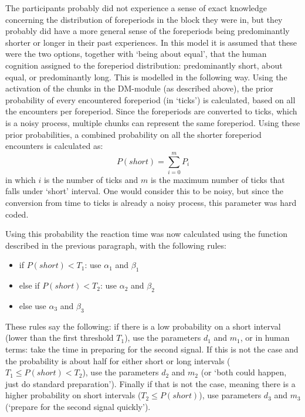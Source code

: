 \documentclass[10pt,letterpaper]{article}
\begin{document}
The participants probably did not experience a sense of exact knowledge concerning the distribution of foreperiods in the block they were in, but they probably did have a more general sense of the foreperiods being predominantly shorter or longer in their past experiences. In this model it is assumed that these were the two options, together with `being about equal', that the human cognition assigned to the foreperiod distribution: predominantly short, about equal, or predominantly long.
This is modelled in the following way. Using the activation of the chunks in the DM-module (as described above), the prior probability of every encountered foreperiod (in `ticks') is calculated, based on all the encounters per foreperiod. Since the foreperiods are converted to ticks, which is a noisy process, multiple chunks can represent the same foreperiod. Using these prior probabilities, a combined probability on all the shorter foreperiod encounters is calculated as:
\begin{equation}
	P(short) = \sum_{i = 0}^{m} P_i
\end{equation}
in which $i$ is the number of ticks and $m$ is the maximum number of ticks that falls under `short' interval. One would consider this to be noisy, but since the conversion from time to ticks is already a noisy process, this parameter was hard coded.

Using this probability the reaction time was now calculated using the function described in the previous paragraph, with the following rules:
\begin{itemize}
	\item if $P(short) < T_1$: use $\alpha_1$ and $\beta_1$
	\item else if $P(short) < T_2$: use $\alpha_2$ and $\beta_2$
	\item else use $\alpha_3$ and $\beta_3$
\end{itemize}
These rules say the following: if there is a low probability on a short interval (lower than the first threshold $T_1$), use the parameters $d_1$ and $m_1$, or in human terms: take the time in preparing for the second signal. If this is not the case and the probability is about half for either short or long intervals ($T_1 \leq P(short) < T_2$), use the parameters $d_2$ and $m_2$ (or `both could happen, just do standard preparation'). Finally if that is not the case, meaning there is a higher probability on short intervals ($T_2 \leq P(short)$), use parameters $d_3$ and $m_3$ (`prepare for the second signal quickly').
\bigskip
\end{document}
